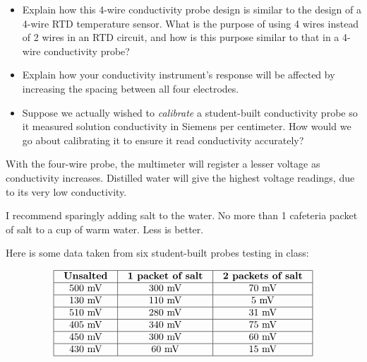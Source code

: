 \begin{itemize}
\item{} Explain how this 4-wire conductivity probe design is similar to the design of a 4-wire RTD temperature sensor.  What is the purpose of using 4 wires instead of 2 wires in an RTD circuit, and how is this purpose similar to that in a 4-wire conductivity probe?
\item{} Explain how your conductivity instrument's response will be affected by increasing the spacing between all four electrodes.
\item{} Suppose we actually wished to {\it calibrate} a student-built conductivity probe so it measured solution conductivity in Siemens per centimeter.  How would we go about calibrating it to ensure it read conductivity accurately?
\end{itemize}














With the four-wire probe, the multimeter will register a lesser voltage as conductivity increases.  Distilled water will give the highest voltage readings, due to its very low conductivity.

\vskip 10pt

I recommend sparingly adding salt to the water.  No more than 1 cafeteria packet of salt to a cup of warm water.  Less is better.

\vskip 10pt

Here is some data taken from six student-built probes testing in class:


$$\vbox{\offinterlineskip
\halign{\strut
\vrule \quad\hfil # \ \hfil & 
\vrule \quad\hfil # \ \hfil & 
\vrule \quad\hfil # \ \hfil \vrule \cr
\noalign{\hrule}
%
{\bf Unsalted} & {\bf 1 packet of salt} & {\bf 2 packets of salt} \cr
%
\noalign{\hrule}
%
500 mV & 300 mV & 70 mV \cr
%
\noalign{\hrule}
%
130 mV & 110 mV & 5 mV \cr
%
\noalign{\hrule}
%
510 mV & 280 mV & 31 mV \cr
%
\noalign{\hrule}
%
405 mV & 340 mV & 75 mV \cr
%
\noalign{\hrule}
%
450 mV & 300 mV & 60 mV \cr
%
\noalign{\hrule}
%
430 mV & 60 mV & 15 mV \cr
%
\noalign{\hrule}
} %
}$$ %




